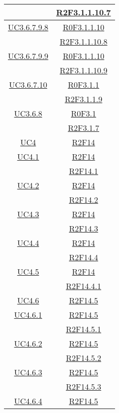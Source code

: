 \begin{longtable}{|c|c|}
& \hyperlink{R2F3.1.1.10.7}{R2F3.1.1.10.7}\\
\hline
\hyperlink{UC3.6.7.9.8}{UC3.6.7.9.8} & \hyperlink{R0F3.1.1.10}{R0F3.1.1.10}\\
& \hyperlink{R2F3.1.1.10.8}{R2F3.1.1.10.8}\\
\hline
\hyperlink{UC3.6.7.9.9}{UC3.6.7.9.9} & \hyperlink{R0F3.1.1.10}{R0F3.1.1.10}\\
& \hyperlink{R2F3.1.1.10.9}{R2F3.1.1.10.9}\\
\hline
\hyperlink{UC3.6.7.10}{UC3.6.7.10} & \hyperlink{R0F3.1.1}{R0F3.1.1}\\
& \hyperlink{R2F3.1.1.9}{R2F3.1.1.9}\\
\hline
\hyperlink{UC3.6.8}{UC3.6.8} & \hyperlink{R0F3.1}{R0F3.1}\\
& \hyperlink{R2F3.1.7}{R2F3.1.7}\\
\hline
\hyperlink{UC4}{UC4} & \hyperlink{R2F14}{R2F14}\\
\hline
\hyperlink{UC4.1}{UC4.1} & \hyperlink{R2F14}{R2F14}\\
& \hyperlink{R2F14.1}{R2F14.1}\\
\hline
\hyperlink{UC4.2}{UC4.2} & \hyperlink{R2F14}{R2F14}\\
& \hyperlink{R2F14.2}{R2F14.2}\\
\hline
\hyperlink{UC4.3}{UC4.3} & \hyperlink{R2F14}{R2F14}\\
& \hyperlink{R2F14.3}{R2F14.3}\\
\hline
\hyperlink{UC4.4}{UC4.4} & \hyperlink{R2F14}{R2F14}\\
& \hyperlink{R2F14.4}{R2F14.4}\\
\hline
\hyperlink{UC4.5}{UC4.5} & \hyperlink{R2F14}{R2F14}\\
& \hyperlink{R2F14.4.1}{R2F14.4.1}\\
\hline
\hyperlink{UC4.6}{UC4.6} & \hyperlink{R2F14.5}{R2F14.5}\\
\hline
\hyperlink{UC4.6.1}{UC4.6.1} & \hyperlink{R2F14.5}{R2F14.5}\\
& \hyperlink{R2F14.5.1}{R2F14.5.1}\\
\hline
\hyperlink{UC4.6.2}{UC4.6.2} & \hyperlink{R2F14.5}{R2F14.5}\\
& \hyperlink{R2F14.5.2}{R2F14.5.2}\\
\hline
\hyperlink{UC4.6.3}{UC4.6.3} & \hyperlink{R2F14.5}{R2F14.5}\\
& \hyperlink{R2F14.5.3}{R2F14.5.3}\\
\hline
\hyperlink{UC4.6.4}{UC4.6.4} & \hyperlink{R2F14.5}{R2F14.5}\\

\end{longtable}
